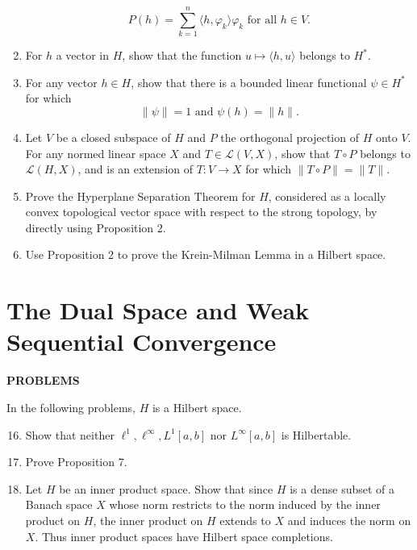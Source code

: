 \begin{enumerate}
    \[
        P(h)=\sum_{k=1}^n\langle h,\varphi_k\rangle\varphi_k\text{ for all }h\in V.
    \]
    \item For $h$ a vector in $H$, show that the function $u\mapsto\langle h,u\rangle$ belongs to $H^*$.
    \item For any vector $h\in H$, show that there is a bounded linear functional $\psi\in H^*$ for which 
    \[
        \|\psi\|=1\text{ and }\psi(h)=\|h\|.  
    \]
    \item Let $V$ be a closed subspace of $H$ and $P$ the orthogonal projection of $H$ onto $V$.
    For any normed linear space $X$ and $T\in\mathcal{L}(V,X)$, show that $T\circ P$ belongs to $\mathcal{L}(H,X)$, and is an extension of $T:V\to X$ for which $\|T\circ P\|=\|T\|$.
    \item Prove the Hyperplane Separation Theorem for $H$, considered as a locally convex topological vector space with respect to the strong topology, by directly using Proposition 2.
    \item Use Proposition 2 to prove the Krein-Milman Lemma in a Hilbert space.
\end{enumerate}

\section{The Dual Space and Weak Sequential Convergence}
\begin{center}
	\textbf{PROBLEMS}
\end{center}
In the following problems, $H$ is a Hilbert space.
\begin{enumerate}
	\setcounter{enumi}{15}
    \item Show that neither $\ell^1,\ell^\infty,L^1[a,b]$ nor $L^\infty[a,b]$ is Hilbertable.
    \item Prove Proposition 7.
    \item Let $H$ be an inner product space. Show that since $H$ is a dense subset of a Banach space $X$ whose norm restricts to the norm induced by the inner product on $H$, the inner product on $H$ extends to $X$ and induces the norm on $X$.
    Thus inner product spaces have Hilbert space completions.
\end{enumerate}


